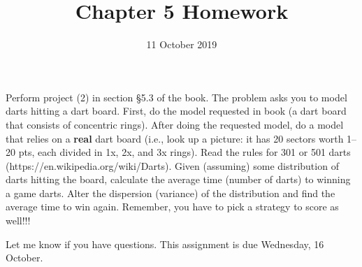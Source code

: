 \documentclass{article}
\title{Chapter 5 Homework}
\date{11 October 2019}
\begin{document}
\maketitle


Perform project (2) in section \S5.3 of the book. The problem asks you to model darts hitting a dart board. First, do the model requested in book (a dart board that consists of concentric rings). After doing the requested model, do a model that relies on a \textbf{real} dart board (i.e., look up a picture: it has 20 sectors worth 1--20 pts, each divided in 1x, 2x, and 3x rings). Read the rules for 301 or 501 darts (https://en.wikipedia.org/wiki/Darts). Given (assuming) some distribution of darts hitting the board, calculate the average time (number of darts) to winning a game darts. Alter the dispersion (variance) of the distribution and find the average time to win again. Remember, you have to pick a strategy to score as well!!!

Let me know if you have questions. This assignment is due Wednesday, 16 October. 
\end{document}
